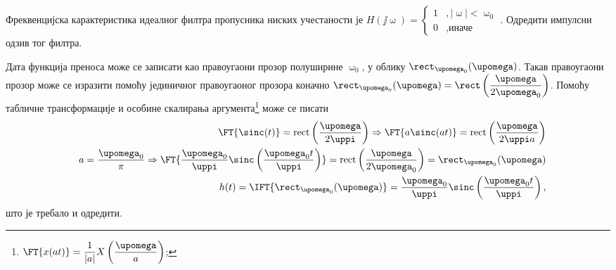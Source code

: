 \PID \label{z:lpf}
Фреквенцијска карактеристика идеалног филтра пропусника ниских учестаности је 
$H(\jj\upomega) = 
\begin{cases}
    1 &, |\upomega| < \upomega_0 \\
    0 &, \text{иначе}
\end{cases}.$ Одредити импулсни одзив тог филтра. 

\RESENJE 

Дата функција преноса може се записати као правоугаони прозор полуширине 
$\upomega_0$, у облику $\rect_{\upomega_0}(\upomega)$.
Такав правоугаони прозор може се изразити помоћу јединичног правоугаоног прозора коначно
$\rect_{\upomega_0}(\upomega) = \rect \left( \dfrac{\upomega}{2\upomega_0} \right)$.
Помоћу табличне трансформације  и особине скалирања аргумента\footnote{
    $\FT{x(at)} = \dfrac{1}{|a|} X\left( \dfrac{\upomega}{a} \right)$;
} може се писати
\begin{eqnarray}
    && \FT{ \sinc(t) } = \mathrm{rect}\left(\frac{\upomega}{2\uppi}\right)
    \Rightarrow
    \FT{ a \sinc(at) } = \mathrm{rect}\left(\frac{\upomega}{2\uppi a}\right) \\ 
    && a = \dfrac{\upomega_0}{\pi} \Rightarrow
    \FT{ \dfrac{\upomega_0}{\uppi} \sinc \left( \dfrac{\upomega_0 t}{\uppi} \right) } = \mathrm{rect}\left(\frac{\upomega}{2 \upomega_0}\right) 
    =   \rect_{\upomega_0} (\upomega) \\ 
    && 
    h(t) 
    = 
    \IFT{ \rect_{\upomega_0} (\upomega)  } = \dfrac{\upomega_0}{\uppi} \sinc \left( \dfrac{\upomega_0 t}{\uppi} \right),
\end{eqnarray}
што је требало и одредити. 
